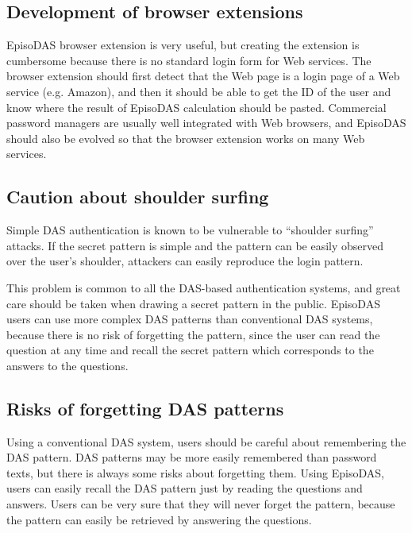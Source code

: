 \documentclass[sigconf]{acmart}
\begin{document}
\subsection{Development of browser extensions}

EpisoDAS browser extension is very useful, but creating the extension
is cumbersome because there is no standard login form for
Web services.
%
The browser extension should first detect that the Web page is a login page
of a Web service (e.g. Amazon),
and then it should be able to get the ID of the user
and know where the result of EpisoDAS calculation should be pasted.
%
Commercial password managers\cite{OnePassword}\cite{Dashlane}\cite{LastPass}\cite{KeyPass}\cite{NortonIDSafe}\cite{IDManager}
are usually well integrated with Web browsers,
and EpisoDAS should also be evolved so that
the browser extension works on many Web services.

\subsection{Caution about shoulder surfing}

Simple DAS authentication is known to be vulnerable to ``shoulder surfing''
attacks\cite{Aviv:2017:TBS:3134600.3134609}.
If the secret pattern is simple and
the pattern can be easily observed over the user's shoulder,
attackers can easily reproduce the login pattern.

This problem is common to all the DAS-based authentication systems,
and great care should be taken when drawing a secret pattern in the public.
EpisoDAS users can use more complex DAS patterns than
conventional DAS systems,
because there is no risk of forgetting the pattern,
since the user can read the question at any time and
recall the secret pattern which corresponds to the
answers to the questions.

\subsection{Risks of forgetting DAS patterns}

Using a conventional DAS system, users should be careful about
remembering the DAS pattern.
DAS patterns may be more easily remembered than password texts,
but there is always some risks about forgetting them.
Using EpisoDAS, users can easily recall the DAS pattern
just by reading the questions and answers.
Users can be very sure that they will never forget the pattern,
because the pattern can easily be retrieved by answering the questions.
\end{document}
